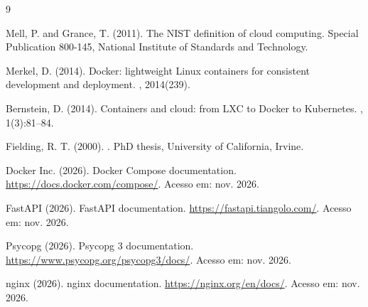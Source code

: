 \documentclass[12pt]{article}
\begin{document}
\begin{thebibliography}{9}

Mell, P. and Grance, T. (2011).
\newblock The NIST definition of cloud computing.
\newblock Special Publication 800-145, National Institute of Standards and
  Technology.

Merkel, D. (2014).
\newblock Docker: lightweight Linux containers for consistent development
  and deployment.
, 2014(239).

Bernstein, D. (2014).
\newblock Containers and cloud: from LXC to Docker to Kubernetes.
, 1(3):81--84.

Fielding, R. T. (2000).
.
\newblock PhD thesis, University of California, Irvine.

Docker Inc. (2026).
\newblock Docker Compose documentation.
\newblock \url{https://docs.docker.com/compose/}. Acesso em: nov. 2026.

FastAPI (2026).
\newblock FastAPI documentation.
\newblock \url{https://fastapi.tiangolo.com/}. Acesso em: nov. 2026.

Psycopg (2026).
\newblock Psycopg 3 documentation.
\newblock \url{https://www.psycopg.org/psycopg3/docs/}. Acesso em: nov. 2026.

nginx (2026).
\newblock nginx documentation.
\newblock \url{https://nginx.org/en/docs/}. Acesso em: nov. 2026.

\end{thebibliography}
\end{document}
